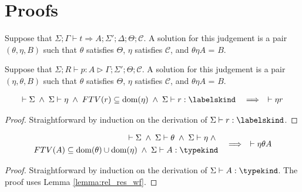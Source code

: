 \section{\vlmini{} Proofs}
\label{appendix:vlmini_safety}

\begin{definition}
Suppose that $\Sigma;\Gamma \vdash t \Rightarrow A;\Sigma'; \Delta; \Theta; \mathcal{C}$. A solution for this judgement is a pair $(\theta, \eta, B)$ such that $\theta$ satisfies $\Theta$, $\eta$ satisfies $\mathcal{C}$, and $\theta \eta A$ = $B$.
\end{definition}

\begin{definition}
Suppose that $\Sigma; R\vdash p : A \rhd \Gamma; \Sigma'; \Theta; \mathcal{C}$. A solution for this judgement is a pair $(\eta, \theta, B)$ such that $\theta$ satisfies $\Theta$, $\eta$ satisfies $\mathcal{C}$, and $\theta \eta A$ = $B$.
\end{definition}

\begin{lemma}
\label{lemma:rel_res_wf}
\begin{align*}
\vdash \Sigma\;\land\;
\Sigma \vdash \eta\;\land\;%
FTV(r) \subseteq \mathrm{dom}(\eta)\;\land\;
\Sigma \vdash r:\labelskind
\quad\Longrightarrow\quad
\vdash \eta r
\end{align*}
\end{lemma}
\begin{proof}
Straightforward by induction on the derivation of $\Sigma \vdash r:\labelskind$.
\end{proof}

\begin{lemma}
\label{lemma:rel_ty_wf}
\begin{align*}
\begin{aligned}
\vdash \Sigma\;\land\;
\Sigma \vdash \theta\;\land\;
\Sigma \vdash \eta\;\land\;\\
FTV(A) \subseteq \mathrm{dom}(\theta)\cup\mathrm{dom}(\eta)\;\land\;
\Sigma \vdash A:\typekind
\end{aligned}
\quad\Longrightarrow\quad
\vdash \eta \theta A
\end{align*}
\end{lemma}
\begin{proof}
Straightforward by induction on the derivation of $\Sigma \vdash A:\typekind$. The proof uses Lemma \ref{lemma:rel_res_wf}.
\end{proof}

